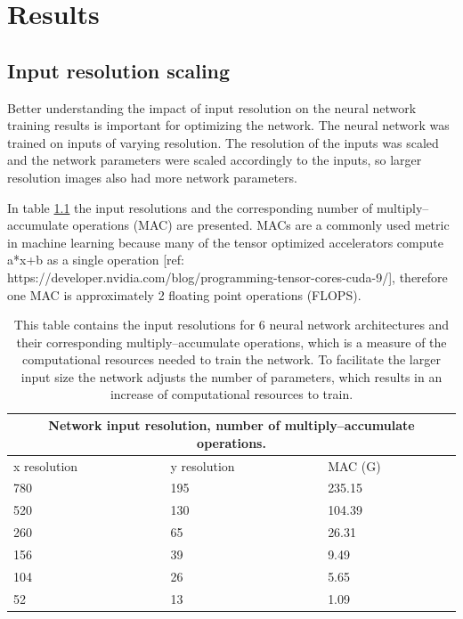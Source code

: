 %
\chapter{Results}
\label{sec:results}

\section{Input resolution scaling}

Better understanding the impact of input resolution on the neural network training results is important for optimizing the network. The neural network was trained on inputs of varying resolution. The resolution of the inputs was scaled and the network parameters were scaled accordingly to the inputs, so larger resolution images also had more network parameters.

In table \ref{table:input} the input resolutions and the corresponding number of multiply–accumulate operations (MAC) are presented. MACs are a commonly used metric in machine learning because many of the tensor optimized accelerators compute a*x+b as a single operation [ref: https://developer.nvidia.com/blog/programming-tensor-cores-cuda-9/], therefore one MAC is approximately 2 floating point operations (FLOPS).

\begin{table}
    \begin{tabular}{ |p{3cm}|p{3cm}|p{4cm}|  }
        \hline
        \multicolumn{3}{|c|}{Network input resolution, number of multiply–accumulate operations.} \\
        \hline
        x resolution & y resolution & MAC (G)                                                     \\
        \hline
        780          & 195          & 235.15                                                      \\
        520          & 130          & 104.39                                                      \\
        260          & 65           & 26.31                                                       \\
        156          & 39           & 9.49                                                        \\
        104          & 26           & 5.65                                                        \\
        52           & 13           & 1.09                                                        \\
        \hline
    \end{tabular}
    \caption{This table contains the input resolutions for 6 neural network architectures and their corresponding multiply–accumulate operations, which is a measure of the computational resources needed to train the network. To facilitate the larger input size the network adjusts the number of parameters, which results in an increase of computational resources to train.}
    \label{table:input}
\end{table}

